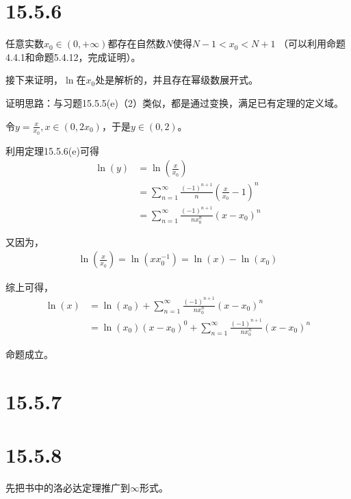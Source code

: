 \documentclass{article}
\begin{document}
\section*{15.5.6}

任意实数$x_0 \in (0, + \infty)$都存在自然数$N$使得$N - 1 < x_0 < N + 1$
（可以利用命题4.4.1和命题5.4.12，完成证明）。

接下来证明，$\ln$在$x_0$处是解析的，并且存在幂级数展开式。

证明思路：与习题15.5.5(e)（2）类似，都是通过变换，满足已有定理的定义域。

令$y = \frac{x}{x_0}, x \in (0, 2x_0)$，于是$y \in (0, 2)$。

利用定理15.5.6(e)可得
\begin{align*}
  \ln(y) & = \ln(\frac{x}{x_0})                                                       \\
         & = \sum \limits_{n = 1}^\infty \frac{(-1)^{n + 1}}{n} (\frac{x}{x_0} - 1)^n \\
         & = \sum \limits_{n = 1}^\infty \frac{(-1)^{n + 1}}{nx_0^n} (x - x_0)^n
\end{align*}

又因为，
\begin{align*}
  \ln(\frac{x}{x_0}) = \ln(xx_0^{-1}) = \ln(x) - \ln(x_0)
\end{align*}

综上可得，
\begin{align*}
  \ln(x) & = \ln(x_0) + \sum \limits_{n = 1}^\infty \frac{(-1)^{n + 1}}{nx_0^n} (x - x_0)^n            \\
         & = \ln(x_0)(x - x_0)^0 + \sum \limits_{n = 1}^\infty \frac{(-1)^{n + 1}}{nx_0^n} (x - x_0)^n
\end{align*}

命题成立。

\section*{15.5.7}



\section*{15.5.8}

先把书中的洛必达定理推广到$\infty$形式。
\end{document}
